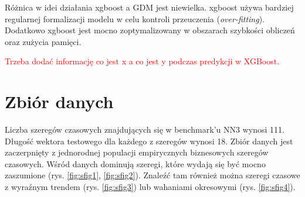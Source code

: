 \documentclass[11pt]{report}
\begin{document}
Różnica w idei działania xgboost a GDM jest niewielka.
xgboost używa bardziej regularnej formalizacji modelu w celu kontroli przeuczenia (\textit{over-fitting}).
Dodatkowo xgboost jest mocno zoptymalizowany w obszarach szybkości obliczeń oraz zużycia pamięci.

\textcolor{red}{Trzeba dodać informację co jest x a co jest y podczas predykcji w XGBoost.}


\section{Zbiór danych}
Liczba szeregów czasowych znajdujących się w benchmark'u NN3 wynosi 111.
Długość wektora testowego dla każdego z szeregów wynosi 18.
Zbiór danych jest zaczerpnięty z jednorodnej populacji empirycznych biznesowych szeregów czasowych.
Wśród danych dominują szeregi, które wydają się być mocno zaszumione (rys. \ref{fig:sfig1}, \ref{fig:sfig2}).
Znaleźć tam również można szeregi czasowe z wyraźnym trendem (rys. \ref{fig:sfig3}) lub wahaniami okresowymi (rys. \ref{fig:sfig4}).
\end{document}

